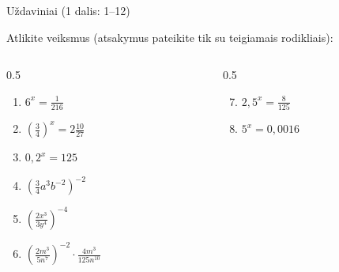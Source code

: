 \documentclass[aspectratio=169,10pt]{beamer}
\begin{document}
\begin{frame}{Uždaviniai (1 dalis: 1--12)}

    \small

    Atlikite veiksmus
    (atsakymus pateikite tik su teigiamais rodikliais):

    \vspace{0.2cm}

    \begin{columns}[T]

        \begin{column}{0.5\textwidth}

            \begin{enumerate}

                \item
                $6^x=\frac{1}{216}$

                \item
                $\left(\frac34\right)^x
                =
                2\frac{10}{27}$

                \item
                $0{,}2^x=125$

                \item
                $\left(
                \frac34a^3b^{-2}
                \right)^{-2}$

                \item
                $\left(
                \frac{2x^3}{3y^4}
                \right)^{-4}$

                \item
                $\left(
                \frac{2m^3}{5n^7}
                \right)^{-2}
                \cdot
                \frac{4m^3}{125n^{10}}$

            \end{enumerate}

        \end{column}

        \begin{column}{0.5\textwidth}

            \begin{enumerate}

                \setcounter{enumi}{6}

                \item
                $2{,}5^x=\frac{8}{125}$

                \item
                $5^x=0{,}0016$


\end{enumerate}
\end{column}
\end{columns}
\end{frame}
\end{document}
